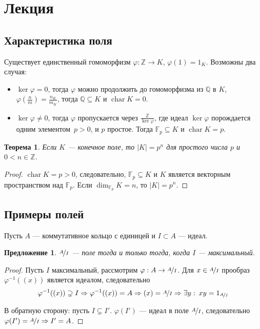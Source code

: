\documentclass[a4paper]{article}
\newcommand{\Q}{\ensuremath{\mathbb{Q}}}
\newcommand{\Z}{\ensuremath{\mathbb{Z}}}
\newcommand{\F}{\ensuremath{\mathbb{F}}}
\let\temp\phi
\let\phi\varphi
\let\varphi\temp
\DeclareMathOperator{\chr}{char}
\newtheorem{theorem}{Теорема}
\numberwithin{theorem}{section}
\numberwithin{lemma}{section}
\newtheorem{proposition}{Предложение}
\numberwithin{proposition}{section}
\numberwithin{corollary}{section}
\begin{document}
\section{Лекция}

\subsection*{Характеристика поля}
Существует единственный гомоморфизм $\phi: \Z \to K$, $\phi(1) = 1_K$.
Возможны два случая:
\begin{itemize}
    \item $\ker \phi = 0$, тогда $\phi$ можно продолжить до гомоморфизма из $\Q$ в $K$,
    $\phi(\frac{n}{m}) = \frac{n_K}{m_K}$,
    тогда $\Q \subseteq K$ и $\chr K = 0$.
    \item
    \begin{minipage}{0.9\linewidth}
        $\ker \phi \ne 0$, тогда $\phi$ пропускается через $\frac{\Z}{\ker \phi}$, где идеал $\ker \phi$ порождается одним элементом~$p > 0$, и $p$ простое.
        Тогда $\F_p \subseteq K$ и $\chr K = p$.
    \end{minipage}
    \begin{minipage}{0.15\linewidth}
    \end{minipage}
\end{itemize}

\begin{theorem}
Если $K$ --- конечное поле, то $|K| = p^n$ для простого числа $p$ и $0 < n \in \Z$.
\end{theorem}
\begin{proof}
$\chr K = p > 0$, следовательно, $\F_p \subseteq K$ и $K$ является векторным пространством над $\F_p$. Если $\dim_{\F_p}K = n$, то $|K| = p^n$.
\end{proof}

\subsection*{Примеры полей}

Пусть $A$ --- коммутативное кольцо с единицей и $I \subset A$ --- идеал.
\begin{proposition}
$\nicefrac{A}{I}$ --- поле тогда и только тогда, когда $I$ --- максимальный.
\end{proposition}
\begin{proof}
Пусть $I$ максимальный, рассмотрим $\phi: A \to \nicefrac{A}{I}$.
Для $x \in \nicefrac{A}{I}$ прообраз $\phi^{-1}((x))$ является идеалом, следовательно
\[\phi^{-1}((x)) \supsetneq I
\Rightarrow \phi^{-1}((x)) = A
\Rightarrow (x) = \nicefrac{A}{I}
\Rightarrow \exists y : \: xy = 1_{\nicefrac{A}{I}}\]

В обратную сторону: пусть $I \subsetneq I'$. $\phi(I')$ --- идеал в
поле $\nicefrac{A}{I}$, следовательно $\phi(I') = \nicefrac{A}{I} \Rightarrow I' = A$.
\end{proof}
\end{document}
